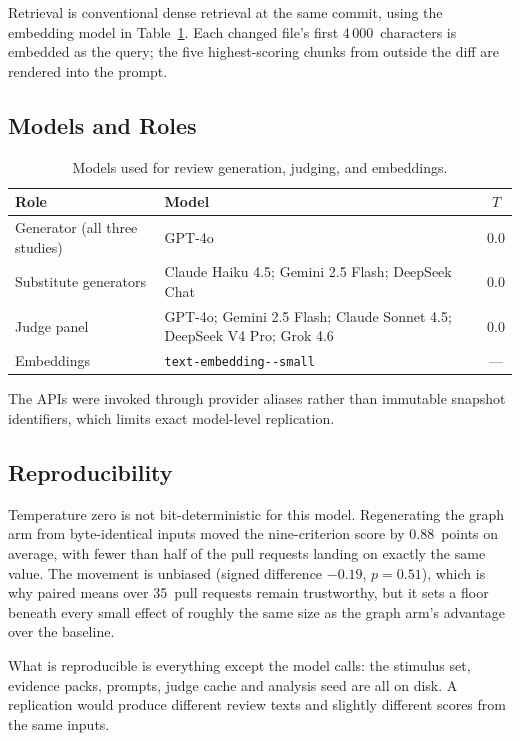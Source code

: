 Retrieval is conventional dense retrieval at the same commit, using the
embedding model in Table~\ref{tab:models}. Each changed file's first
4\,000~characters is embedded as the query; the five highest-scoring chunks
from outside the diff are rendered into the prompt.

\subsection{Models and Roles}
\label{sec:model-inventory}

\begin{table}[htbp]
    \centering
    \caption{Models used for review generation, judging, and embeddings.}
    \label{tab:models}
    \footnotesize
    \begin{tabularx}{\textwidth}{@{}lXc@{}}
        \toprule
        Role & Model & $T$ \\
        \midrule
        Generator (all three studies)
          & GPT-4o & 0.0 \\
        \midrule
        Substitute generators
          & Claude Haiku 4.5; Gemini 2.5 Flash; DeepSeek Chat & 0.0 \\
        \midrule
        Judge panel
          & GPT-4o; Gemini 2.5 Flash; Claude Sonnet 4.5;
            DeepSeek V4 Pro; Grok 4.6 & 0.0 \\
        \midrule
        Embeddings & \texttt{text-embedding-\allowbreak3-small} & --- \\
        \bottomrule
    \end{tabularx}
\end{table}

The APIs were invoked through provider aliases rather than immutable snapshot
identifiers, which limits exact model-level replication.

\subsection{Reproducibility}
\label{sec:repro}

Temperature zero is not bit-deterministic for this model. Regenerating the
graph arm from byte-identical inputs moved the nine-criterion score by
$0.88$~points on average, with fewer than half of the pull requests landing
on exactly the same value. The movement is unbiased (signed difference $-0.19$,
$p = 0.51$), which is why paired means over 35~pull requests remain
trustworthy, but it sets a floor beneath every small effect of roughly the
same size as the graph arm's advantage over the baseline.

What is reproducible is everything except the model calls: the stimulus set,
evidence packs, prompts, judge cache and analysis seed are all on disk. A
replication would produce different review texts and slightly different scores
from the same inputs.